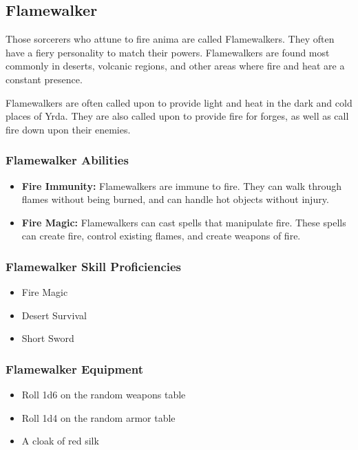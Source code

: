 \begin{multicols}{2}
\subsection{Flamewalker}

Those sorcerers who attune to fire anima are called Flamewalkers. They
often have a fiery personality to match their powers. Flamewalkers are
found most commonly in deserts, volcanic regions, and other areas where
fire and heat are a constant presence.

Flamewalkers are often called upon to provide light and heat in the
dark and cold places of Yrda. They are also called upon to provide
fire for forges, as well as call fire down upon their enemies.

\subsubsection{Flamewalker Abilities}

\begin{itemize}
  \item \textbf{Fire Immunity:} Flamewalkers are immune to fire. They can
    walk through flames without being burned, and can handle hot objects
    without injury.
  \item \textbf{Fire Magic:} Flamewalkers can cast spells that manipulate
    fire. These spells can create fire, control existing flames, and
    create weapons of fire.
\end{itemize}

\subsubsection{Flamewalker Skill Proficiencies}

\begin{itemize}
  \item Fire Magic
  \item Desert Survival
  \item Short Sword
\end{itemize}

\subsubsection{Flamewalker Equipment}

\begin{itemize}
  \item Roll 1d6 on the random weapons table
  \item Roll 1d4 on the random armor table
  \item A cloak of red silk
\end{itemize}


\end{multicols}

